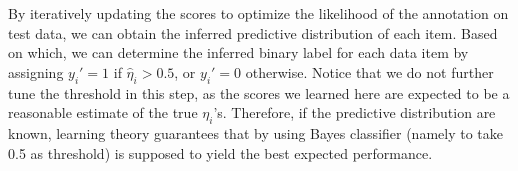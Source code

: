 By iteratively updating the scores to optimize the likelihood of the annotation on test data, 
we can obtain the inferred predictive distribution of each item.  
Based on which, we can determine the inferred binary label for each data item by assigning $y_i'=1$ if $\hat{\eta}_i > 0.5$, 
or $y_i'=0$ otherwise.  
Notice that we do not further tune the threshold in this step, 
as the scores we learned here are expected to be a reasonable estimate of the true $\eta_i$'s. 
Therefore, if the predictive distribution are known, 
learning theory guarantees that by using Bayes classifier (namely to take 0.5 as threshold) 
is supposed to yield the best expected performance.  




